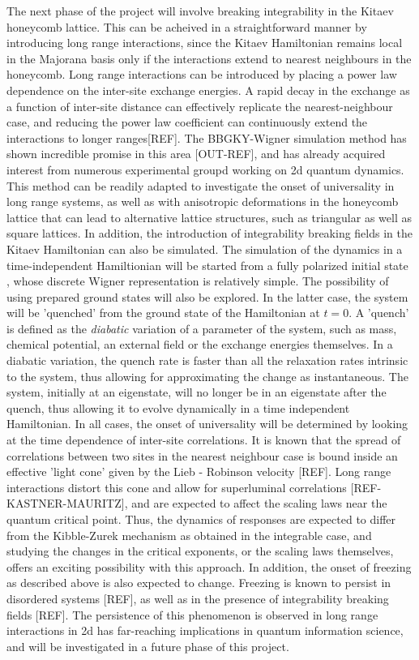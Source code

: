 \documentclass[a4paper,11pt,color]{article}
\begin{document}
The next phase of the project will involve breaking integrability in the Kitaev honeycomb lattice. This can be acheived in a straightforward manner by introducing long range interactions, since the Kitaev Hamiltonian remains local in the Majorana basis only if the interactions extend to nearest neighbours in the honeycomb. Long range interactions can be introduced by placing a power law dependence on the inter-site exchange energies. A rapid decay in the exchange as a function of inter-site distance can effectively replicate the nearest-neighbour case, and reducing the power law coefficient can continuously extend the interactions to longer ranges[REF]. The BBGKY-Wigner simulation method has shown incredible promise in this area [OUT-REF], and has already acquired interest from numerous experimental groupd working on 2d quantum dynamics. This method can be readily adapted to investigate the onset of universality in long range systems, as well as with anisotropic deformations in the honeycomb lattice that can lead to alternative lattice structures, such as triangular as well as square lattices. In addition, the introduction of integrability breaking fields in the Kitaev Hamiltonian can also be simulated. The simulation of the dynamics  in a time-independent Hamiltionian will be started from a fully polarized initial state , whose discrete Wigner representation is relatively simple. The possibility of using prepared ground states will also be explored. In the latter case, the system will be 'quenched' from the ground state of the Hamiltonian at $t=0$. A 'quench' is defined as the \textit{diabatic} variation of a {parameter} of the system, such as  mass, chemical potential, an external field or the exchange energies themselves. In a diabatic variation, the quench rate is faster than all the relaxation rates intrinsic to the system, thus allowing for approximating the change as instantaneous. The system, initially at an eigenstate, will no longer be in an eigenstate after the quench, thus allowing it to evolve dynamically in a time independent Hamiltonian. In all cases, the onset of universality will be determined by looking at the time dependence of inter-site correlations. It is known that the spread of correlations between two sites in the nearest neighbour case is bound inside an effective 'light cone' given by the Lieb - Robinson velocity [REF]. Long range interactions distort this cone and allow for superluminal correlations [REF-KASTNER-MAURITZ], and are expected to affect the scaling laws near the quantum critical point. Thus, the dynamics of responses are expected to differ from the Kibble-Zurek mechanism as obtained in the integrable case, and studying the changes in the critical exponents, or the scaling laws themselves, offers an exciting possibility with this approach. In addition, the onset of freezing as described above is also expected to change. Freezing is known to persist in disordered systems [REF], as well as in the presence of integrability breaking fields [REF]. The persistence of this phenomenon is observed in long range interactions in 2d has far-reaching implications in quantum information science, and will be investigated in a future phase of this project.
\end{document}

